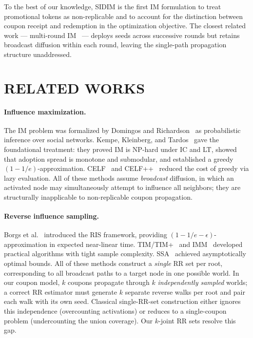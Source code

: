 \documentclass[sigconf]{acmart}
\begin{document}
To the best of our knowledge, SIDIM is the first IM formulation to
treat promotional tokens as non-replicable and to account for the
distinction between coupon receipt and redemption in the optimization
objective.  The closest related work — multi-round
IM~\cite{sun2018multi} — deploys seeds across successive rounds but
retains broadcast diffusion within each round, leaving the single-path
propagation structure unaddressed.

\section{RELATED WORKS}
\label{sec:related}

\paragraph{Influence maximization.}
The IM problem was formalized by Domingos and
Richardson~\cite{domingos2001mining,richardson2002mining} as
probabilistic inference over social networks.
Kempe, Kleinberg, and Tardos~\cite{kempe2003maximizing} gave the
foundational treatment: they proved IM is NP-hard under IC and LT,
showed that adoption spread is monotone and submodular, and established
a greedy $(1{-}1/e)$-approximation.
CELF~\cite{leskovec2007celf} and CELF++~\cite{goyal2011celf} reduced
the cost of greedy via lazy evaluation.
All of these methods assume \emph{broadcast} diffusion, in which an
activated node may simultaneously attempt to influence all neighbors;
they are structurally inapplicable to non-replicable coupon propagation.

\paragraph{Reverse influence sampling.}
Borgs et al.~\cite{borgs2014maximizing} introduced the RIS framework,
providing $(1{-}1/e{-}\epsilon)$-approximation in expected near-linear
time.
TIM/TIM+~\cite{tang2014influence} and IMM~\cite{tang2015influence}
developed practical algorithms with tight sample complexity.
SSA~\cite{nguyen2016stop} achieved asymptotically optimal bounds.
All of these methods construct a \emph{single} RR set per root,
corresponding to all broadcast paths to a target node in one possible
world.
In our coupon model, $k$ coupons propagate through $k$
\emph{independently sampled} worlds; a correct RR estimator must
generate $k$ separate reverse walks per root and pair each walk with its
own seed.
Classical single-RR-set construction either ignores this independence
(overcounting activations) or reduces to a single-coupon problem
(undercounting the union coverage).
Our $k$-joint RR sets resolve this gap.
\end{document}
